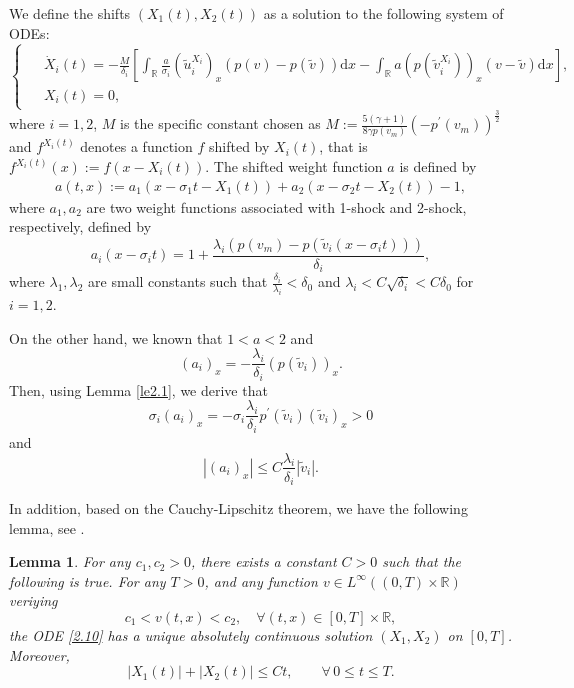 \documentclass[10pt,reqno]{amsart}
\numberwithin{equation}{section}
\newtheorem{lemma}[theorem]{Lemma}
\newcommand{\dif}{\mathrm{d}}
\begin{document}
We define the shifts $(X_1(t),X_2(t))$ as a solution to the following system of ODEs:
\begin{equation}\label{2.10}
\begin{cases}
\begin{aligned}
&\dot{X}_i(t)=-\frac{M}{\delta_i}
\left[\int_{\mathbb{R}}\frac{a}{\sigma_i}(\widetilde{u}_i^{X_i})_x(p(v)-p(\widetilde{v}))\dif x
-\int_{\mathbb{R}}a\left(p(\widetilde{v}_i^{X_i})\right)_x(v-\widetilde{v})\dif x\right],\\
&X_i(t)=0,
\end{aligned}
\end{cases}
\end{equation}
where $i=1,2$, $M$ is the specific constant chosen as $M:=\frac{5(\gamma+1)}{8\gamma p(v_m)}(-p^{\prime}(v_m))^{\frac{3}{2}}$ and $f^{X_i(t)}$ denotes a function $f$ shifted by $X_i(t)$, that is $f^{X_i(t)}(x):=f(x-X_i(t))$. The shifted weight function $a$ is defined by
\begin{align}\label{2.11}
a(t,x):=a_1(x-\sigma_1t-X_1(t))+a_2(x-\sigma_2t-X_2(t))-1,
\end{align}
where $a_1,a_2$ are two weight functions associated with 1-shock and 2-shock, respectively, defined by
\[
a_i(x-\sigma_it)=1+\frac{\lambda_i(p(v_m)-p(\widetilde{v}_i(x-\sigma_it)))}{\delta_i},
\]
where $\lambda_1,\lambda_2$ are small constants  such that $\frac{\delta_i}{\lambda_i}<\delta_0$ and $\lambda_i<C\sqrt{\delta_i}<C\delta_0$ for $i=1,2$.

On the other hand, we known that $1<a<2$ and
\[
(a_i)_x=-\frac{\lambda_i}{\delta_i}(p(\widetilde{v}_i))_x.
\]
Then, using Lemma \ref{le2.1}, we derive that
\begin{equation}\label{2.12}
\sigma_i(a_i)_x=-\sigma_i\frac{\lambda_i}{\delta_i}p^{\prime}(\widetilde{v}_i)(\widetilde{v}_i)_x>0
\end{equation}
and
\begin{equation}\label{2.13}
|(a_i)_x|\le C\frac{\lambda_i}{\delta_i}|\widetilde{v}_i|.
\end{equation}

In addition, based on the Cauchy-Lipschitz theorem, we have the following lemma, see \cite{WY, SMJ}.
\begin{lemma}\label{le3.10}
For any $c_1, c_2>0$, there exists a constant $C>0$ such that the following is true. For any $T>0$, and any function $v\in L^{\infty}((0,T )\times \mathbb{R})$ veriying
\begin{equation}\label{3.11-1}
c_1<v(t,x)<c_2,\quad \forall(t,x)\in[0, T]\times\mathbb{R},
\end{equation}
the ODE \eqref{2.10} has a unique absolutely continuous solution $(X_1, X_2)$ on $[0, T]$. Moreover,
\begin{equation}\label{3.10-2}
|X_1(t)|+|X_2(t)|\le C t, \qquad \forall \, 0\le t \le T.
\end{equation}
\end{lemma}
\end{document}
